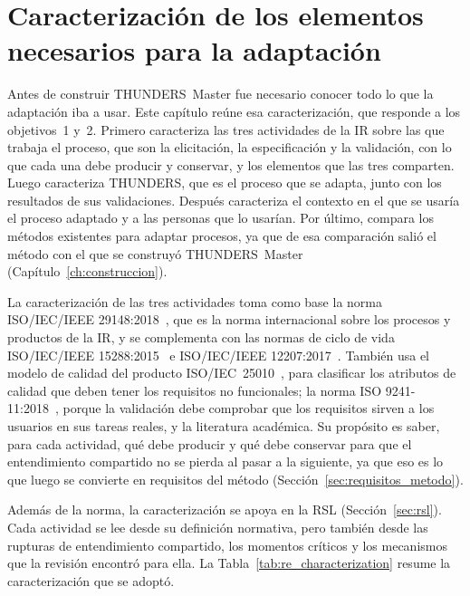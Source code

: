 \documentclass[12pt,letterpaper,oneside]{report}
\begin{document}
\chapter{Caracterización de los elementos necesarios para la adaptación}
\label{ch:caracterizacion}

Antes de construir THUNDERS~Master fue necesario conocer todo lo que la
adaptación iba a usar. Este capítulo reúne esa caracterización, que responde a
los objetivos~1 y~2. Primero caracteriza las tres actividades de la IR sobre las que trabaja el
proceso, que son la elicitación, la especificación y la validación, con lo que
cada una debe producir y conservar, y los elementos que las tres comparten.
Luego caracteriza THUNDERS, que es el proceso que se adapta, junto con los
resultados de sus validaciones.
Después caracteriza el contexto en el que se usaría el proceso adaptado y a las
personas que lo usarían. Por último, compara los métodos existentes para adaptar
procesos, ya que de esa comparación salió el método con el que se construyó
THUNDERS~Master (Capítulo~\ref{ch:construccion}). 

La caracterización de las tres actividades toma como base la norma
ISO/IEC/IEEE 29148:2018~\cite{iso29148}, que es la norma internacional sobre los
procesos y productos de la IR, y se complementa con las normas de ciclo de vida
ISO/IEC/IEEE 15288:2015~\cite{iso15288} e ISO/IEC/IEEE 12207:2017~\cite{iso12207}.
También usa el modelo de calidad del producto ISO/IEC~25010~\cite{iso25010}, para
clasificar los atributos de calidad que deben tener los requisitos no
funcionales; la norma ISO 9241-11:2018~\cite{iso9241}, porque la validación debe
comprobar que los requisitos sirven a los usuarios en sus tareas reales, y la
literatura académica. Su propósito es saber, para cada actividad, qué debe producir y qué
debe conservar para que el entendimiento compartido no se pierda al pasar a la
siguiente, ya que eso es lo que luego se convierte en requisitos del método
(Sección~\ref{sec:requisitos_metodo}).

Además de la norma, la caracterización se apoya en la RSL
(Sección~\ref{sec:rsl}). Cada actividad se lee desde su definición normativa,
pero también desde las rupturas de entendimiento compartido, los momentos críticos y los
mecanismos que la revisión encontró para ella. La
Tabla~\ref{tab:re_characterization} resume la caracterización que se adoptó.
\end{document}
